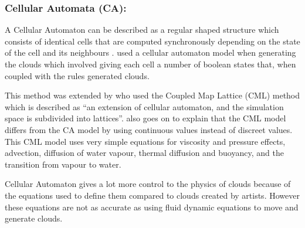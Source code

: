 \subsubsection{Cellular Automata (CA):}
\label{sec:ca}
A Cellular Automaton can be described as a regular shaped structure which consists of identical cells that are computed synchronously depending on the state of the cell and its neighbours \citep{SDantchev11}.
\citet{DobashiEtAl00} used a cellular automaton model when generating the clouds which involved giving each cell a number of boolean states that, when coupled with the rules generated clouds.

This method was extended by \citet{Miyazaki01} who used the Coupled Map Lattice (CML) method which is described as “an extension of cellular automaton, and the simulation space is subdivided into lattices”.
\citet{Miyazaki01} also goes on to explain that the CML model differs from the CA model by using continuous values instead of discreet values.
This CML model uses very simple equations for viscosity and pressure effects, advection, diffusion of water vapour, thermal diffusion and buoyancy, and the transition from vapour to water.

Cellular Automaton gives a lot more control to the physics of clouds because of the equations used to define them compared to clouds created by artists.
However these equations are not as accurate as using fluid dynamic equations to move and generate clouds.
